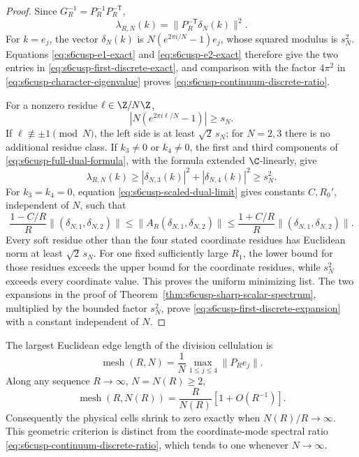 \begin{proof}
Since \(G_R^{-1}=P_R^{-1}P_R^{-\mathsf T}\),
\[
 \lambda_{R,N}(k)
 =\lVert P_R^{-\mathsf T}\delta_N(k)\rVert^2.
\]
For \(k=e_j\), the vector \(\delta_N(k)\) is
\(N(e^{2\pi i/N}-1)e_j\), whose squared modulus is \(s_N^2\).
Equations \eqref{eq:s6cusp-e1-exact} and
\eqref{eq:s6cusp-e2-exact} therefore give the two entries in
\eqref{eq:s6cusp-first-discrete-exact}, and comparison with the factor
\(4\pi^2\) in \eqref{eq:s6cusp-character-eigenvalue} proves
\eqref{eq:s6cusp-continuum-discrete-ratio}.

For a nonzero residue \(\ell\in\Z/N\Z\),
\[
 \left|N(e^{2\pi i\ell/N}-1)\right|\ge s_N.
\]
If \(\ell\not\equiv\pm1\pmod N\), the left side is at least
\(\sqrt2\,s_N\); for \(N=2,3\) there is no additional residue class.
If \(k_3\ne0\) or \(k_4\ne0\), the first and third components of
\eqref{eq:s6cusp-full-dual-formula}, with the formula extended
\(\C\)-linearly, give
\[
 \lambda_{R,N}(k)\ge
 |\delta_{N,3}(k)|^2+|\delta_{N,4}(k)|^2\ge s_N^2.
\]
For \(k_3=k_4=0\), equation
\eqref{eq:s6cusp-scaled-dual-limit} gives constants \(C,R_0'\),
independent of \(N\), such that
\[
 \frac{1-C/R}{R}\lVert(\delta_{N,1},\delta_{N,2})\rVert
 \le
 \lVert A_R(\delta_{N,1},\delta_{N,2})\rVert
 \le
 \frac{1+C/R}{R}\lVert(\delta_{N,1},\delta_{N,2})\rVert.
\]
Every soft residue other than the four stated coordinate residues has
Euclidean norm at least \(\sqrt2\,s_N\).  For one fixed sufficiently large
\(R_1\), the lower bound for those residues exceeds the upper bound for
the coordinate residues, while \(s_N^2\) exceeds every coordinate value.
This proves the uniform minimizing list.  The two expansions in the proof
of Theorem~\ref{thm:s6cusp-sharp-scalar-spectrum}, multiplied by the bounded
factor \(s_N^2\), prove \eqref{eq:s6cusp-first-discrete-expansion} with a
constant independent of \(N\).
\end{proof}

\begin{proposition}
\label{prop:s6cusp-physical-mesh-criterion}
The largest Euclidean edge length of the division cellulation is
\begin{equation}\label{eq:s6cusp-physical-mesh-exact}
 \operatorname{mesh}(R,N)=
 \frac1N\max_{1\le j\le4}\lVert P_Re_j\rVert.
\end{equation}
Along any sequence \(R\to\infty\), \(N=N(R)\ge2\),
\begin{equation}\label{eq:s6cusp-physical-mesh-asymptotic}
 \operatorname{mesh}(R,N(R))
 =\frac{R}{N(R)}\left[1+O(R^{-1})\right].
\end{equation}
Consequently the physical cells shrink to zero exactly when
\(N(R)/R\to\infty\).  This geometric criterion is distinct from the
coordinate-mode spectral ratio \eqref{eq:s6cusp-continuum-discrete-ratio},
which tends to one whenever \(N\to\infty\).
\end{proposition}

